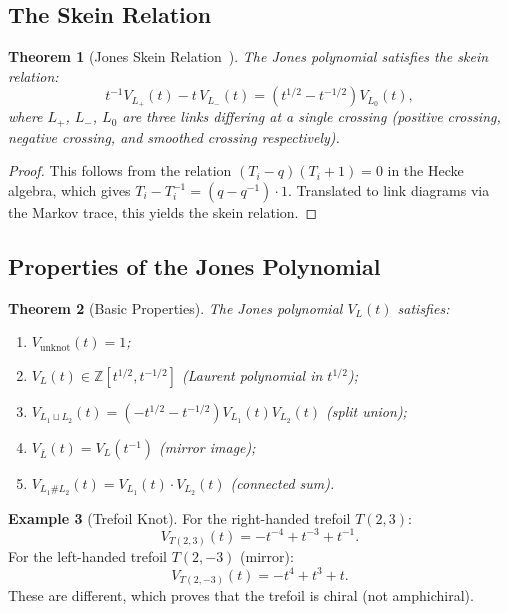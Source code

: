 \documentclass[12pt,a4paper]{amsart}
\newtheorem{theorem}{Theorem}[section]
\theoremstyle{definition}
\newtheorem{example}[theorem]{Example}
\theoremstyle{remark}
\newcommand{\Z}{\mathbb{Z}}
\begin{document}
\subsection{The Skein Relation}

\begin{theorem}[Jones Skein Relation~\cite{Jones1985}]
The Jones polynomial satisfies the skein relation:
\[
    t^{-1} V_{L_+}(t) - t \, V_{L_-}(t) = (t^{1/2} - t^{-1/2}) V_{L_0}(t),
\]
where $L_+$, $L_-$, $L_0$ are three links differing at a single crossing
(positive crossing, negative crossing, and smoothed crossing respectively).
\end{theorem}

\begin{proof}
This follows from the relation $(T_i - q)(T_i + 1) = 0$ in the Hecke algebra,
which gives $T_i - T_i^{-1} = (q - q^{-1}) \cdot 1$. Translated to link
diagrams via the Markov trace, this yields the skein relation.
\end{proof}

\subsection{Properties of the Jones Polynomial}

\begin{theorem}[Basic Properties]
The Jones polynomial $V_L(t)$ satisfies:
\begin{enumerate}[label=\roman*)]
\item $V_{\text{unknot}}(t) = 1$;
\item $V_L(t) \in \Z[t^{1/2}, t^{-1/2}]$ (Laurent polynomial in $t^{1/2}$);
\item $V_{L_1 \sqcup L_2}(t) = (-t^{1/2} - t^{-1/2}) V_{L_1}(t) V_{L_2}(t)$
      (split union);
\item $V_{\bar{L}}(t) = V_L(t^{-1})$ (mirror image);
\item $V_{L_1 \# L_2}(t) = V_{L_1}(t) \cdot V_{L_2}(t)$ (connected sum).
\end{enumerate}
\end{theorem}

\begin{example}[Trefoil Knot]
For the right-handed trefoil $T(2,3)$:
\[
    V_{T(2,3)}(t) = -t^{-4} + t^{-3} + t^{-1}.
\]
For the left-handed trefoil $T(2,-3)$ (mirror):
\[
    V_{T(2,-3)}(t) = -t^{4} + t^{3} + t.
\]
These are different, which proves that the trefoil is chiral (not amphichiral).
\end{example}
\end{document}
